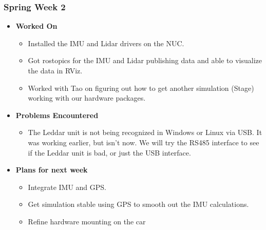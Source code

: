 \documentclass{article}
\begin{document}
\subsubsection{Spring Week 2}
\begin{itemize}
    \item {\textbf{Worked On}}
    \begin{itemize}
        \item Installed the IMU and Lidar drivers on the NUC.
        \item Got rostopics for the IMU and Lidar publishing data and able to visualize the data in RViz.
        \item Worked with Tao on figuring out how to get another simulation (Stage) working with our hardware packages.
    \end{itemize}

    \item {\textbf{Problems Encountered}}
    \begin{itemize}
        \item The Leddar unit is not being recognized in Windows or Linux via USB. It was working earlier, but isn't now. We will try the RS485 interface to see if the Leddar unit is bad, or just the USB interface.
    \end{itemize}

    \item{\textbf{Plans for next week}}
    \begin{itemize}
        \item Integrate IMU and GPS.
        \item Get simulation stable using GPS to smooth out the IMU calculations.
        \item Refine hardware mounting on the car
    \end{itemize}
\end{itemize}
\end{document}

